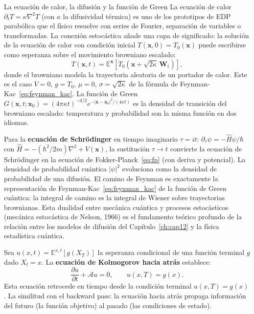 \begin{fisicaconexion}{La ecuación de calor, la difusión y la función de Green}
La ecuación de calor $\partial_t T = \kappa\nabla^2 T$ (con $\kappa$ la
difusividad térmica) es uno de los prototipos de EDP parabólica que el físico
resuelve con series de Fourier, separación de variables o transformadas. La
conexión estocástica añade una capa de significado: la solución de la ecuación
de calor con condición inicial $T(\bm{x},0) = T_0(\bm{x})$ puede escribirse
como esperanza sobre el movimiento browniano escalado:
\[
  T(\bm{x},t) = \mathbb{E}^{\bm{x}}[T_0(\bm{x} + \sqrt{2\kappa}\,\bm{W}_t)],
\]
donde el browniano modela la trayectoria aleatoria de un portador de calor.
Este es el caso $V=0$, $g = T_0$, $\mu = 0$, $\sigma = \sqrt{2\kappa}$ de la
fórmula de Feynman-Kac~\eqref{eq:feynman_kac}. La función de Green
$G(\bm{x},t;\bm{x}_0) = (4\pi\kappa t)^{-d/2}e^{-|\bm{x}-\bm{x}_0|^2/(4\kappa t)}$
es la densidad de transición del browniano escalado: temperatura y probabilidad
son la misma función en dos idiomas.

Para la \textbf{ecuación de Schrödinger} en tiempo imaginario $\tau = it$:
$\partial_\tau\psi = -\hat{H}\psi/\hbar$ con $\hat{H} = -(\hbar^2/2m)\nabla^2
+ V(\bm{x})$, la sustitución $\tau \to t$ convierte la ecuación de Schrödinger
en la ecuación de Fokker-Planck~\eqref{eq:fp} (con deriva y potencial). La
densidad de probabilidad cuántica $|\psi|^2$ evoluciona como la densidad de
probabilidad de una difusión. El camino de Feynman es exactamente la
representación de Feynman-Kac~\eqref{eq:feynman_kac} de la función de Green
cuántica: la integral de camino es la integral de Wiener sobre trayectorias
brownianas. Esta dualidad entre mecánica cuántica y procesos estocásticos
(mecánica estocástica de Nelson, 1966) es el fundamento teórico profundo de la
relación entre los modelos de difusión del Capítulo~\ref{ch:cap12} y la física
estadística cuántica.
\end{fisicaconexion}
\label{subsec:kolmogorov_atras}

Sea $u(x,t) = \mathbb{E}^{x,t}[g(X_T)]$ la esperanza condicional de una
función terminal $g$ dado $X_t = x$. La \textbf{ecuación de Kolmogorov hacia
atrás} establece:
\begin{equation}
  \frac{\partial u}{\partial t} + \mathcal{A}u = 0,
  \qquad u(x,T) = g(x).
  \label{eq:kolmogorov_atras}
\end{equation}
Esta ecuación retrocede en tiempo desde la condición terminal $u(x,T) = g(x)$.
La similitud con el backward pass: la ecuación hacia atrás propaga información
del futuro (la función objetivo) al pasado (las condiciones de estado).

